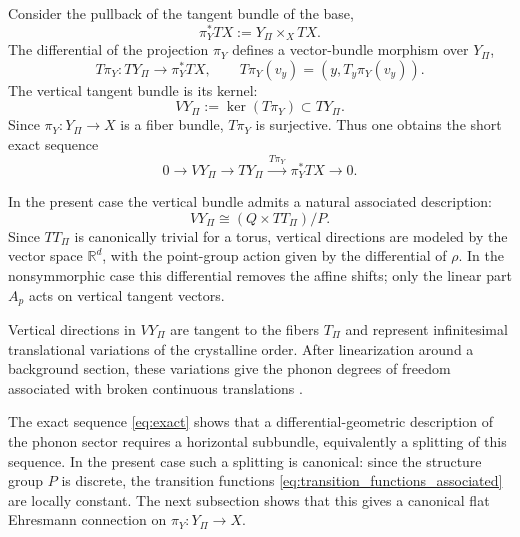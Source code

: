 \documentclass[11pt]{amsart}
\theoremstyle{plain}
\theoremstyle{definition}
\theoremstyle{remark}
\begin{document}
Consider the pullback of the tangent bundle of the base,
\begin{equation}
	\pi_Y^*TX:=Y_\Pi\times_X TX.
	\label{eq:pullback_TX}
\end{equation}
The differential of the projection \(\pi_Y\) defines a vector-bundle morphism over \(Y_\Pi\),
\begin{equation}
	T\pi_Y:TY_\Pi\longrightarrow \pi_Y^*TX,
	\qquad
	T\pi_Y(v_y)=(y,T_y\pi_Y(v_y)).
	\label{eq:TpiY}
\end{equation}
The vertical tangent bundle is its kernel:
\begin{equation}
	VY_\Pi:=\ker(T\pi_Y)\subset TY_\Pi.
	\label{eq:vertical}
\end{equation}
Since \(\pi_Y:Y_\Pi\to X\) is a fiber bundle, \(T\pi_Y\) is surjective. 
Thus one obtains the short exact sequence
\begin{equation}
	0\longrightarrow VY_\Pi\longrightarrow TY_\Pi
	\xrightarrow{\,T\pi_Y\,}\pi_Y^*TX\longrightarrow 0.
	\label{eq:exact}
\end{equation}

In the present case the vertical bundle admits a natural associated description:
\begin{equation}
	VY_\Pi \cong (Q\times TT_\Pi)/P.
	\label{eq:vertical_associated}
\end{equation}
Since \(TT_\Pi\) is canonically trivial for a torus, vertical directions are modeled by the vector space \(\mathbb R^d\), with the point-group action given by the differential of \(\rho\). 
In the nonsymmorphic case this differential removes the affine shifts; only the linear part \(A_p\) acts on vertical tangent vectors.

Vertical directions in \(VY_\Pi\) are tangent to the fibers \(T_\Pi\) and represent infinitesimal translational variations of the crystalline order. 
After linearization around a background section, these variations give the phonon degrees of freedom associated with broken continuous translations \cite{LeutwylerPhonons,WatanabeMurayama2013,HayataHidaka2014,AndersenBraunerHofmannVuorinen}.

The exact sequence \eqref{eq:exact} shows that a differential-geometric description of the phonon sector requires a horizontal subbundle, equivalently a splitting of this sequence. 
In the present case such a splitting is canonical: since the structure group \(P\) is discrete, the transition functions \eqref{eq:transition_functions_associated} are locally constant. 
The next subsection shows that this gives a canonical flat Ehresmann connection on \(\pi_Y:Y_\Pi\to X\).
\end{document}
